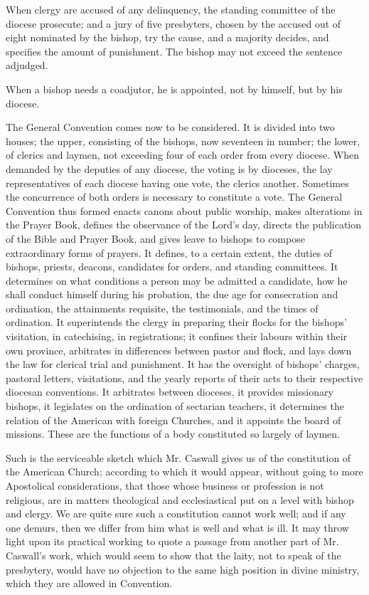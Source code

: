 When clergy are accused of any delinquency, the
standing committee of the diocese prosecute; and a jury of five
presbyters, chosen by the accused out of eight nominated by the
bishop, try the cause, and a majority decides, and specifies the
amount of punishment. The bishop may not exceed the sentence adjudged.

When a bishop needs a coadjutor, he is appointed,
not by himself, but by his diocese.

The General Convention comes now to be
considered. It is divided into two houses; the upper, consisting of
the bishops, now seventeen in number; the lower, of clerics and
laymen, not exceeding four of each order from every diocese.
When demanded by the deputies of any diocese, the voting is by
dioceses, the lay representatives of each diocese having one vote, the
clerics another. Sometimes the concurrence of both orders is necessary
to constitute a vote. The General Convention thus formed enacts canons
about public worship, makes alterations in the Prayer Book, defines
the observance of the Lord's day, directs the publication of the Bible
and Prayer Book, and gives leave to bishops to compose extraordinary
forms of prayers. It defines, to a certain extent, the duties of
bishops, priests, deacons, candidates for orders, and standing
committees. It determines on what conditions a person may be admitted
a candidate, how he shall conduct himself during his probation, the
due age for consecration and ordination, the attainments requisite,
the testimonials, and the times of ordination. It superintends the
clergy in preparing their flocks for the bishops' visitation, in
catechising, in registrations; it confines their labours within their
own province, arbitrates in differences between pastor and flock, and
lays down the law for clerical trial and punishment. It has the
oversight of bishops' charges, pastoral letters, visitations, and the
yearly reports of their acts to their respective diocesan conventions.
It arbitrates between dioceses, it provides missionary bishops, it
legislates on the ordination of sectarian teachers, it determines the
relation of the American with foreign Churches, and it appoints the
board of missions. These are the functions of a body constituted so
largely of laymen.

Such is the serviceable sketch which Mr. Caswall
gives us of the constitution of the American Church; according to
which it would appear, without going to more Apostolical
considerations, that those whose business or profession is not
religious, are in matters theological and ecclesiastical put on
a level with bishop and clergy. We are quite sure such a constitution
cannot work well; and if any one demurs, then we differ from him what
is well and what is ill. It may throw light upon its practical working
to quote a passage from another part of Mr. Caswall's work, which
would seem to show that the laity, not to speak of the presbytery,
would have no objection to the same high position in divine ministry,
which they are allowed in Convention.

